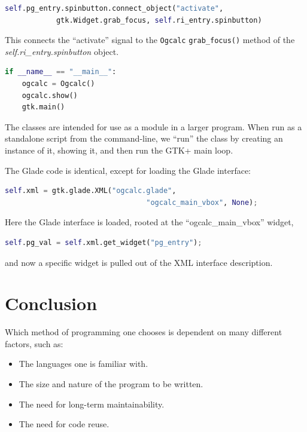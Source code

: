 \documentclass[a4paper,oneside]{article}
\newcommand{\variable}[1]{\textsl{#1}}
\newcommand{\class}[1]{\texttt{#1}}
\newcommand{\function}[1]{\texttt{#1()}}
\begin{document}
\begin{lstlisting}[numbers=none, language=Python]
        self.pg_entry.spinbutton.connect_object("activate",
            gtk.Widget.grab_focus, self.ri_entry.spinbutton)
\end{lstlisting}

This connects the ``activate'' signal to the \class{Ogcalc}
\function{grab\_focus} method of the
\variable{self.ri\_entry.spinbutton} object.

\begin{lstlisting}[numbers=none, language=Python]
if __name__ == "__main__":
    ogcalc = Ogcalc()
    ogcalc.show()
    gtk.main()
\end{lstlisting}

The classes are intended for use as a module in a larger program.
When run as a standalone script from the command-line, we ``run'' the
class by creating an instance of it, showing it, and then run the GTK+
main loop.

The Glade code is identical, except for loading the Glade interface:

\begin{lstlisting}[numbers=none, language=Python]
        self.xml = gtk.glade.XML("ogcalc.glade",
                                 "ogcalc_main_vbox", None);
\end{lstlisting}

Here the Glade interface is loaded, rooted at the
``ogcalc\_main\_vbox'' widget,

\begin{lstlisting}[numbers=none, language=Python]
        self.pg_val = self.xml.get_widget("pg_entry");
\end{lstlisting}

\noindent and now a specific widget is pulled out of the XML interface
description.


\section{Conclusion}

Which method of programming one chooses is dependent on many different
factors, such as:

\begin{itemize}
\item{The languages one is familiar with.}
\item{The size and nature of the program to be written.}
\item{The need for long-term maintainability.}
\item{The need for code reuse.}
\end{itemize}
\end{document}
